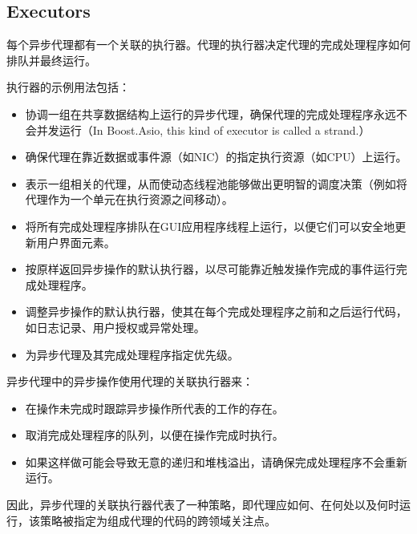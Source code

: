 \subsection{Executors}
每个异步代理都有一个关联的执行器。代理的执行器决定代理的完成处理程序如何排队并最终运行。

执行器的示例用法包括：
\begin{itemize}
	\item 协调一组在共享数据结构上运行的异步代理，确保代理的完成处理程序永远不会并发运行（In Boost.Asio, this kind of executor is called a strand.）
	\item 确保代理在靠近数据或事件源（如NIC）的指定执行资源（如CPU）上运行。
	\item 表示一组相关的代理，从而使动态线程池能够做出更明智的调度决策（例如将代理作为一个单元在执行资源之间移动）。
	\item 将所有完成处理程序排队在GUI应用程序线程上运行，以便它们可以安全地更新用户界面元素。
	\item 按原样返回异步操作的默认执行器，以尽可能靠近触发操作完成的事件运行完成处理程序。
	\item 调整异步操作的默认执行器，使其在每个完成处理程序之前和之后运行代码，如日志记录、用户授权或异常处理。
	\item 为异步代理及其完成处理程序指定优先级。
\end{itemize}

异步代理中的异步操作使用代理的关联执行器来：
\begin{itemize}
	\item 在操作未完成时跟踪异步操作所代表的工作的存在。
	\item 取消完成处理程序的队列，以便在操作完成时执行。
	\item 如果这样做可能会导致无意的递归和堆栈溢出，请确保完成处理程序不会重新运行。
\end{itemize}
因此，异步代理的关联执行器代表了一种策略，即代理应如何、在何处以及何时运行，该策略被指定为组成代理的代码的跨领域关注点。